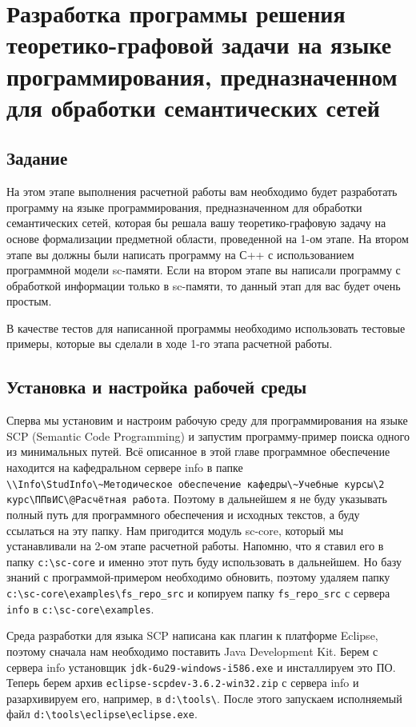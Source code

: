 
\chapter{Разработка программы решения теоретико-графовой задачи на
  языке программирования, предназначенном для обработки семантических
  сетей}

\section{Задание}

На этом этапе выполнения расчетной работы вам необходимо будет
разработать программу на языке программирования, предназначенном для
обработки семантических сетей, которая бы решала вашу
теоретико-графовую задачу на основе формализации предметной области,
проведенной на 1-ом этапе. На втором этапе вы должны были написать
программу на С++ с использованием программной модели sc-памяти. Если
на втором этапе вы написали программу с обработкой информации только в
sc-памяти, то данный этап для вас будет очень простым.

В качестве тестов для написанной программы необходимо использовать
тестовые примеры, которые вы сделали в ходе 1-го этапа расчетной
работы.

\section{Установка и настройка рабочей среды}

Сперва мы установим и настроим рабочую среду для программирования на
языке SCP (Semantic Code Programming) и запустим программу-пример
поиска одного из минимальных путей. Всё описанное в этой главе
программное обеспечение находится на кафедральном сервере info в папке
\verb|\\Info\StudInfo\~Методическое обеспечение кафедры\~Учебные курсы\2 курс\ППвИС\@Расчётная работа|. Поэтому в дальнейшем я не буду
указывать полный путь для программного обеспечения и исходных текстов,
а буду ссылаться на эту папку. Нам пригодится модуль sc-core, который
мы устанавливали на 2-ом этапе расчетной работы. Напомню, что я ставил
его в папку \verb|c:\sc-core| и именно этот путь буду использовать в
дальнейшем. Но базу знаний с программой-примером необходимо обновить,
поэтому удаляем папку \verb|c:\sc-core\examples\fs_repo_src| и
копируем папку \verb|fs_repo_src| с сервера \verb|info| в
\verb|c:\sc-core\examples|.

Среда разработки для языка SCP написана как плагин к платформе
Eclipse, поэтому сначала нам необходимо поставить Java Development
Kit. Берем с сервера info установщик \verb|jdk-6u29-windows-i586.exe|
и инсталлируем это ПО. Теперь берем архив
\verb|eclipse-scpdev-3.6.2-win32.zip| с сервера info и разархивируем
его, например, в \verb|d:\tools\|. После этого запускаем исполняемый
файл \verb|d:\tools\eclipse\eclipse.exe|.

